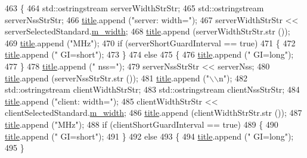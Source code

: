 \begin{DoxyCode}
{463     \{
464       std::ostringstream serverWidthStrStr;
465       std::ostringstream serverNssStrStr;
466       \hyperlink{lte__link__budget_8m_a5b09b57ee35b13a452f0c089c0709f8b}{title}.append (\textcolor{stringliteral}{"server: width="});
467       serverWidthStrStr << serverSelectedStandard.\hyperlink{structStandardInfo_a5b3709fd42061dfc2a51115978136abc}{m\_width};
468       \hyperlink{lte__link__budget_8m_a5b09b57ee35b13a452f0c089c0709f8b}{title}.append (serverWidthStrStr.str ());
469       \hyperlink{lte__link__budget_8m_a5b09b57ee35b13a452f0c089c0709f8b}{title}.append (\textcolor{stringliteral}{"MHz"});
470       \textcolor{keywordflow}{if} (serverShortGuardInterval == \textcolor{keyword}{true})
471         \{
472           \hyperlink{lte__link__budget_8m_a5b09b57ee35b13a452f0c089c0709f8b}{title}.append (\textcolor{stringliteral}{" GI=short"});
473         \}
474       \textcolor{keywordflow}{else}
475         \{
476           \hyperlink{lte__link__budget_8m_a5b09b57ee35b13a452f0c089c0709f8b}{title}.append (\textcolor{stringliteral}{" GI=long"});
477         \}
478       \hyperlink{lte__link__budget_8m_a5b09b57ee35b13a452f0c089c0709f8b}{title}.append (\textcolor{stringliteral}{" nss="});
479       serverNssStrStr << serverNss;
480       \hyperlink{lte__link__budget_8m_a5b09b57ee35b13a452f0c089c0709f8b}{title}.append (serverNssStrStr.str ());
481       \hyperlink{lte__link__budget_8m_a5b09b57ee35b13a452f0c089c0709f8b}{title}.append (\textcolor{stringliteral}{"\(\backslash\)\(\backslash\)n"});
482       std::ostringstream clientWidthStrStr;
483       std::ostringstream clientNssStrStr;
484       \hyperlink{lte__link__budget_8m_a5b09b57ee35b13a452f0c089c0709f8b}{title}.append (\textcolor{stringliteral}{"client: width="});
485       clientWidthStrStr << clientSelectedStandard.\hyperlink{structStandardInfo_a5b3709fd42061dfc2a51115978136abc}{m\_width};
486       \hyperlink{lte__link__budget_8m_a5b09b57ee35b13a452f0c089c0709f8b}{title}.append (clientWidthStrStr.str ());
487       \hyperlink{lte__link__budget_8m_a5b09b57ee35b13a452f0c089c0709f8b}{title}.append (\textcolor{stringliteral}{"MHz"});
488       \textcolor{keywordflow}{if} (clientShortGuardInterval == \textcolor{keyword}{true})
489         \{
490           \hyperlink{lte__link__budget_8m_a5b09b57ee35b13a452f0c089c0709f8b}{title}.append (\textcolor{stringliteral}{" GI=short"});
491         \}
492       \textcolor{keywordflow}{else}
493         \{
494           \hyperlink{lte__link__budget_8m_a5b09b57ee35b13a452f0c089c0709f8b}{title}.append (\textcolor{stringliteral}{" GI=long"});
495         \}
}
\end{DoxyCode}
